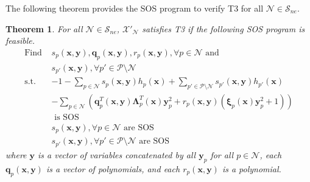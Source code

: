 \documentclass[letterpaper, 10 pt, conference]{ieeeconf}  %
\newtheorem{theorem}{Theorem}
\begin{document}
The following theorem provides the SOS program to verify T3 for all $\mathcal{N}\in\mathcal{S}_{ne}$.
\begin{theorem}
\label{thm:verification_T3}
    For all $\mathcal{N}\in\mathcal{S}_{ne}$, $\mathcal{X}'_{\mathcal{N}}$ satisfies T3 if the following SOS program is feasible.
    \begin{subequations}
    \label{eq:T3_verification_prog}
    \begin{align}
        \text{Find } &s_p(\mathbf{x},\mathbf{y}), \mathbf{q}_p(\mathbf{x}, \mathbf{y}), r_p(\mathbf{x},\mathbf{y}), \forall p\in\mathcal{N} \text{ and } \nonumber \\
        &s_{p'}(\mathbf{x},\mathbf{y}), \forall p'\in\mathcal{P}\setminus\mathcal{N}\\
        \text{s.t. } &-1 - \sum_{p\in\mathcal{N}}s_p(\mathbf{x}, \mathbf{y})h_p(\mathbf{x}) + \sum_{p'\in\mathcal{P}\setminus\mathcal{N}} s_{p'}(\mathbf{x},\mathbf{y})h_{p'}(\mathbf{x}) \nonumber \\
        &- \sum_{p\in\mathcal{N}}\left(\mathbf{q}^T_p(\mathbf{x},\mathbf{y})\boldsymbol{\Lambda}^T_p(\mathbf{x})\mathbf{y}_p^2 + r_p(\mathbf{x},\mathbf{y})(\boldsymbol{\xi}_p(\mathbf{x})\mathbf{y}^2_p + 1)\right) \nonumber\\
        &\text{ is SOS} \label{eq:T3_verif_prog_SOS}\\
        &s_p(\mathbf{x},\mathbf{y}), \forall p\in\mathcal{N} \text{ are SOS}\\
        &s_{p'}(\mathbf{x},\mathbf{y}), \forall p'\in\mathcal{P}\setminus\mathcal{N} \text{ are SOS}
    \end{align}
    \end{subequations}
    where $\mathbf{y}$ is a vector of variables concatenated by all $\mathbf{y}_p$ for all $p\in\mathcal{N}$, each $\mathbf{q}_p(\mathbf{x},\mathbf{y})$ is a vector of polynomials, and each $r_p(\mathbf{x},\mathbf{y})$ is a polynomial. 
\end{theorem}
\end{document}
